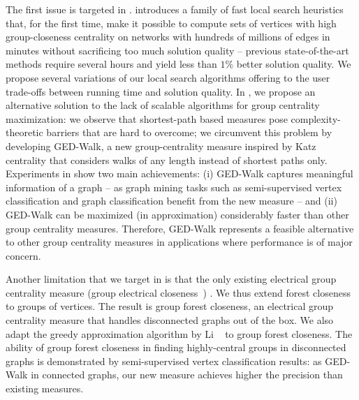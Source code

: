 The first issue is targeted in
.
 introduces a family of fast local
search heuristics that, for the first time, make it possible to compute sets of
vertices with high group-closeness centrality on networks with hundreds of
millions of edges in minutes without sacrificing too much solution quality --
previous state-of-the-art methods require several hours and yield less than
$1\%$ better solution quality.
We propose several variations of our local search algorithms offering to the
user trade-offs between running time and solution quality.
In , we propose an alternative solution to the lack of scalable
algorithms for group centrality maximization: we observe that shortest-path based
measures pose complexity-theoretic barriers that are hard to overcome; we
circumvent this problem by developing GED-Walk, a new group-centrality measure
inspired by Katz centrality that considers walks of any length instead of
shortest paths only.
Experiments in  show two main achievements: (i)
GED-Walk captures meaningful information of a graph -- as graph mining
tasks such as semi-supervised vertex classification and graph classification
benefit from the new measure -- and (ii) GED-Walk can be maximized (in approximation)
considerably faster than other group centrality measures. Therefore, GED-Walk
represents a feasible alternative to other group centrality measures in
applications where performance is of major concern.

Another limitation that we target in  is that the only
existing electrical group centrality measure (\ie group electrical
closeness~\cite{DBLP:conf/www/0002PSYZ19}) . We thus extend forest
closeness~\cite{chebotarev2000forest} to groups of vertices. The result is
group forest closeness, an electrical group centrality measure that handles
disconnected graphs out of the box. We also adapt the greedy approximation
algorithm by Li \etal~\cite{DBLP:conf/www/0002PSYZ19} to group forest
closeness. The ability of
group forest closeness in finding highly-central groups in disconnected graphs
is demonstrated by semi-supervised vertex classification results: as GED-Walk
in connected graphs, our new measure achieves higher the precision than
existing measures.

